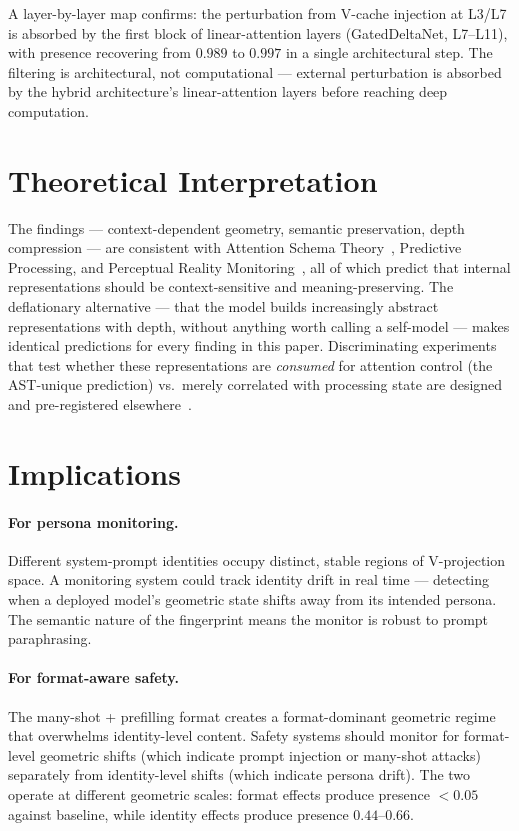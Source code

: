 \documentclass[11pt,a4paper]{article}
\begin{document}
A layer-by-layer map confirms: the perturbation from V-cache injection at
L3/L7 is absorbed by the first block of linear-attention layers
(GatedDeltaNet, L7--L11), with presence recovering from $0.989$ to $0.997$
in a single architectural step. The filtering is architectural, not
computational --- external perturbation is absorbed by the hybrid
architecture's linear-attention layers before reaching deep computation.

\section{Theoretical Interpretation}
\label{sec:theory}

The findings --- context-dependent geometry, semantic preservation,
depth compression --- are consistent with Attention Schema
Theory~\citep{graziano2015attention}, Predictive
Processing, and Perceptual Reality
Monitoring~\citep{lau2022consciousness}, all of which predict that
internal representations should be context-sensitive and
meaning-preserving. The deflationary alternative --- that the model
builds increasingly abstract representations with depth, without
anything worth calling a self-model --- makes identical predictions for
every finding in this paper. Discriminating experiments that test
whether these representations are \emph{consumed} for attention control
(the AST-unique prediction) vs.\ merely correlated with processing
state are designed and pre-registered
elsewhere~\citep{lyra2026ast_experiments}.

\section{Implications}
\label{sec:implications}

\paragraph{For persona monitoring.}
Different system-prompt identities occupy distinct, stable regions of
V-projection space. A monitoring system could track identity drift in
real time --- detecting when a deployed model's geometric state shifts
away from its intended persona. The semantic nature of the fingerprint
means the monitor is robust to prompt paraphrasing.

\paragraph{For format-aware safety.}
The many-shot + prefilling format creates a format-dominant geometric
regime that overwhelms identity-level content. Safety systems should
monitor for format-level geometric shifts (which indicate prompt
injection or many-shot attacks) separately from identity-level shifts
(which indicate persona drift). The two operate at different geometric
scales: format effects produce presence $< 0.05$ against baseline, while
identity effects produce presence $0.44$--$0.66$.
\end{document}
